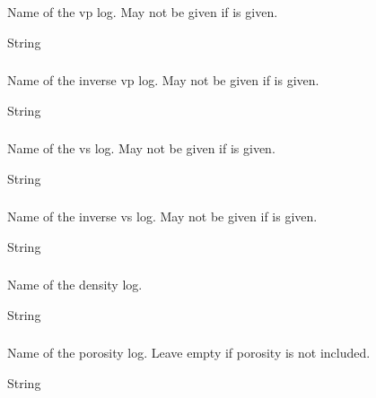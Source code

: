 \subsubsection{}
 \slist
   \item \Description Name of the vp log. May not be given if  is given.
   \item \Argument String
   \item \Default
 \elist

\subsubsection{}
 \slist
   \item \Description Name of the inverse vp log. May not be given if  is given.
   \item \Argument String
   \item \Default %
 \elist

\subsubsection{}
 \slist
   \item \Description Name of the vs log. May not be given if  is given.
   \item \Argument String
   \item \Default
 \elist

\subsubsection{}
 \slist
   \item \Description Name of the inverse vs log. May not be given if  is given.
   \item \Argument String
   \item \Default %
 \elist

\subsubsection{}
 \slist
   \item \Description Name of the density log.
   \item \Argument String
   \item \Default %
 \elist

\subsubsection{}
 \slist
   \item \Description Name of the porosity log. Leave empty if porosity is not included.
   \item \Argument String
   \item \Default
 \elist

